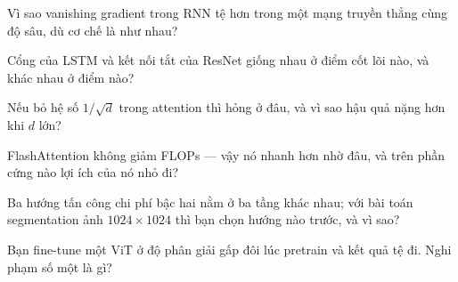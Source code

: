 \documentclass[../../../deep_learning.tex]{subfiles}
\begin{document}
\begin{tukiem}
\item Vì sao vanishing gradient trong RNN tệ hơn trong một mạng truyền thẳng cùng độ sâu, dù cơ chế là như nhau?
\item Cổng của LSTM và kết nối tắt của ResNet giống nhau ở điểm cốt lõi nào, và khác nhau ở điểm nào?
\item Nếu bỏ hệ số \(1/\sqrt{d}\) trong attention thì hỏng ở đâu, và vì sao hậu quả nặng hơn khi \(d\) lớn?
\item FlashAttention không giảm FLOPs --- vậy nó nhanh hơn nhờ đâu, và trên phần cứng nào lợi ích của nó nhỏ đi?
\item Ba hướng tấn công chi phí bậc hai nằm ở ba tầng khác nhau; với bài toán segmentation ảnh \(1024\times1024\) thì bạn chọn hướng nào trước, và vì sao?
\item Bạn fine-tune một ViT ở độ phân giải gấp đôi lúc pretrain và kết quả tệ đi. Nghi phạm số một là gì?
\end{tukiem}
\ifSubfilesClassLoaded{\printbibliography[title={Nguồn}]}{}
\end{document}
